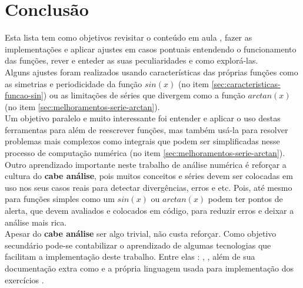\section{Conclusão}
Esta lista tem como objetivos revisitar o conteúdo em aula \cite{notas-aula}, fazer as implementações e aplicar ajustes em casos pontuais entendendo o funcionamento das funções, rever e enteder as suas peculiaridades e como explorá-las. \\
Alguns ajustes foram realizados usando características das próprias funções como as simetrias e periodicidade da função $sin(x)$ (no item \ref{sec:caracteristicas-funcao-sin}) ou as limitações de séries que divergem como a função $arctan(x)$ (no item \ref{sec:melhoramentos-serie-arctan}).\\
Um objetivo paralelo e muito interessante foi entender e aplicar o uso destas ferramentas para além de reescrever funções, mas também usá-la para resolver problemas mais complexos como integrais que podem ser simplificadas nesse processo de computação numérica (no item \ref{sec:melhoramentos-serie-arctan}).\\
Outro aprendizado importante neste trabalho de análise numérica é reforçar a cultura do \textbf{cabe análise}, pois muitos conceitos e séries devem ser colocadas em uso nos seus casos reais para detectar divergências, erros e etc. Pois, até mesmo para funções simples como um $sin(x)$ ou $arctan(x)$ podem ter pontos de alerta, que devem avaliados e colocados em código, para reduzir erros e deixar a análise mais rica. \\
Apesar do \textbf{cabe análise} ser algo trivial, não custa reforçar. Como objetivo secundário pode-se contabilizar o aprendizado de algumas tecnologias que facilitam a implementação deste trabalho.
Entre elas : \cite{site-latex}, \cite{site-gradle}, \cite{site-gnuplot-oficial} além de sua documentação extra como \cite{site-gnuplot-documentacao} e a própria linguagem usada para implementação dos exercícios \cite{site-python-org}.